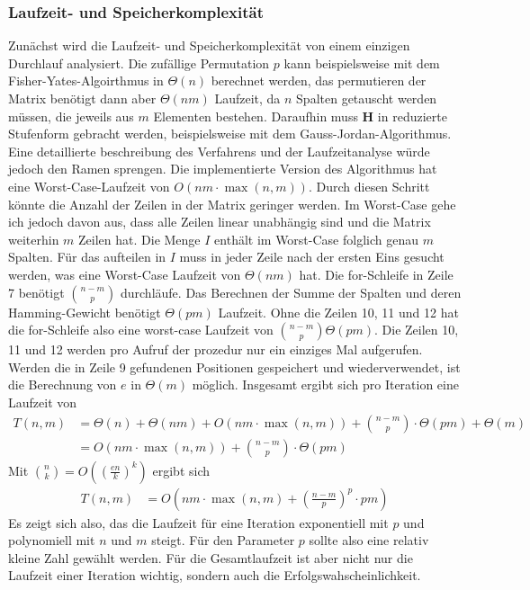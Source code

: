 \documentclass[a4paper,10pt,ngerman]{scrartcl}
\begin{document}
\subsubsection{Laufzeit- und Speicherkomplexität}
Zunächst wird die Laufzeit- und Speicherkomplexität von einem einzigen Durchlauf analysiert. 
Die zufällige Permutation $p$ kann beispielsweise mit dem Fisher-Yates-Algoirthmus in $\Theta(n)$ berechnet werden, das permutieren der Matrix benötigt dann aber $\Theta(nm)$ Laufzeit, da $n$ Spalten getauscht werden müssen, die jeweils aus $m$ Elementen bestehen.
Daraufhin muss $\mathbf{H}$ in reduzierte Stufenform gebracht werden, beispielsweise mit dem Gauss-Jordan-Algorithmus. 
Eine detaillierte beschreibung des Verfahrens und der Laufzeitanalyse würde jedoch den Ramen sprengen.
Die implementierte Version des Algorithmus hat eine Worst-Case-Laufzeit von $O(nm\cdot \max(n,m))$.
Durch diesen Schritt könnte die Anzahl der Zeilen in der Matrix geringer werden. 
Im Worst-Case gehe ich jedoch davon aus, dass alle Zeilen linear unabhängig sind und die Matrix weiterhin $m$ Zeilen hat. 
Die Menge $I$ enthält im Worst-Case folglich genau $m$ Spalten.
Für das aufteilen in $I$ muss in jeder Zeile nach der ersten Eins gesucht werden, was eine Worst-Case Laufzeit von $\Theta(nm)$ hat.
Die for-Schleife in Zeile 7 benötigt $\binom{n-m}{p}$ durchläufe.
Das Berechnen der Summe der Spalten und deren Hamming-Gewicht benötigt $\Theta(pm)$ Laufzeit. 
Ohne die Zeilen 10, 11 und 12 hat die for-Schleife also eine worst-case Laufzeit von $\binom{n-m}{p}\Theta(pm)$.
Die Zeilen 10, 11 und 12 werden pro Aufruf der prozedur nur ein einziges Mal aufgerufen. Werden die in Zeile 9 gefundenen Positionen gespeichert und wiederverwendet, ist die Berechnung von $e$ in $\Theta(m)$ möglich. 
Insgesamt ergibt sich pro Iteration eine Laufzeit von 
\begin{align*}
    T(n, m) &= \Theta(n) + \Theta(nm) + O(nm \cdot \max(n, m)) + \binom{n-m}{p} \cdot \Theta(pm) + \Theta(m)\\
               &= O(nm \cdot \max(n, m))  + \binom{n-m}{p}\cdot \Theta(pm)
\end{align*}
Mit $\binom{n}{k} = O\left(\left(\frac{en}{k}\right)^k\right)$ ergibt sich
\begin{align*}
    T(n, m) &= O\left(nm \cdot \max(n, m) +\left(\frac{n-m}{p}\right)^p \cdot pm\right)
\end{align*}
Es zeigt sich also, das die Laufzeit für eine Iteration exponentiell mit $p$ und polynomiell mit $n$ und $m$ steigt. Für den Parameter $p$ sollte also eine relativ kleine Zahl gewählt werden.
Für die Gesamtlaufzeit ist aber nicht nur die Laufzeit einer Iteration wichtig, sondern auch die Erfolgswahscheinlichkeit.
\end{document}

